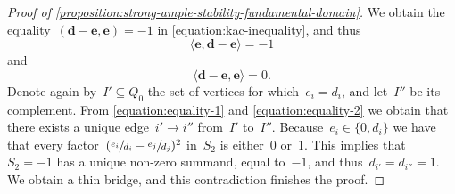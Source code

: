 \documentclass[11pt]{article}
\theoremstyle{plain}
\theoremstyle{definition}
\newcommand\tuple[1]{\ensuremath{{\boldsymbol{#1}}}}
\begin{document}
\begin{proof}[Proof of \cref{proposition:strong-ample-stability-fundamental-domain}]
We obtain the equality~$(\tuple{d}-\tuple{e},\tuple{e})=-1$ in \eqref{equation:kac-inequality},
and thus\vspace*{-3pt}
\begin{equation}
\label{equation:equality-1}
\langle\tuple{e},\tuple{d}-\tuple{e}\rangle=-1
\end{equation}
and\vspace*{-3pt}
\begin{equation}
\label{equation:equality-2}
\langle\tuple{d}-\tuple{e},\tuple{e}\rangle=0.
\end{equation}
Denote again by~$I'\subseteq Q_0$ the set of vertices for which~$e_i=d_i$,
and let~$I''$ be its complement.
From \eqref{equation:equality-1} and \eqref{equation:equality-2}
we obtain that there exists a unique edge~$i'\to i''$ from~$I'$ to~$I''$.
Because~$e_i\in\{0,d_i\}$ we have that every factor~$(\sfrac{e_i}{d_i}-\sfrac{e_j}{d_j})^2$
in~$S_2$ is either~0 or~1.
This implies that~$S_2=-1$ has a unique non-zero summand,
equal to~$-1$,
and thus~$d_{i'}=d_{i''}=1$.
We obtain a thin bridge,
and this contradiction finishes the proof.
\end{proof}

\end{document}
